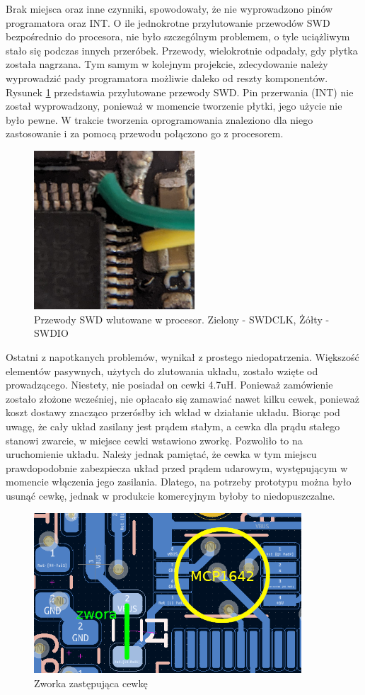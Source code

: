 Brak miejsca oraz inne czynniki, spowodowały, że nie wyprowadzono pinów programatora oraz INT. O ile jednokrotne przylutowanie przewodów SWD bezpośrednio do procesora, nie było szczególnym problemem, o tyle uciążliwym stało się podczas innych przeróbek. Przewody, wielokrotnie odpadały, gdy płytka została nagrzana. Tym samym w kolejnym projekcie, zdecydowanie należy wyprowadzić pady programatora możliwie daleko od reszty komponentów. Rysunek \ref{img:fix_swd} przedstawia przylutowane przewody SWD. Pin przerwania (INT) nie został wyprowadzony, ponieważ w momencie tworzenie płytki, jego użycie nie było pewne. W trakcie tworzenia oprogramowania znaleziono dla niego zastosowanie i za pomocą przewodu połączono go z procesorem.

\begin{figure}[H]
    \centering
    \includegraphics[width=6cm]{Graphics/fix_swd.png}
    \caption{Przewody SWD wlutowane w procesor. Zielony - SWDCLK, Żółty - SWDIO}
    \label{img:fix_swd}
\end{figure}
Ostatni z napotkanych problemów, wynikał z prostego niedopatrzenia. Większość elementów pasywnych, użytych do zlutowania układu, zostało wzięte od prowadzącego. Niestety, nie posiadał on cewki 4.7uH. Ponieważ zamówienie zostało złożone wcześniej, nie opłacało się zamawiać nawet kilku cewek, ponieważ koszt dostawy znacząco przerósłby ich wkład w działanie układu. Biorąc pod uwagę, że cały układ zasilany jest prądem stałym, a cewka dla prądu stałego stanowi zwarcie, w miejsce cewki wstawiono zworkę. Pozwoliło to na uruchomienie układu. Należy jednak pamiętać, że cewka w tym miejscu prawdopodobnie zabezpiecza układ przed prądem udarowym, występującym w momencie włączenia jego zasilania. Dlatego, na potrzeby prototypu można było usunąć cewkę, jednak w produkcie komercyjnym byłoby to niedopuszczalne.
\begin{figure}[H]
    \centering
    \includegraphics[width=10cm]{Graphics/fix_inductor.png}
    \caption{Zworka zastępująca cewkę}
    \label{img:fix_inductor}
\end{figure}

